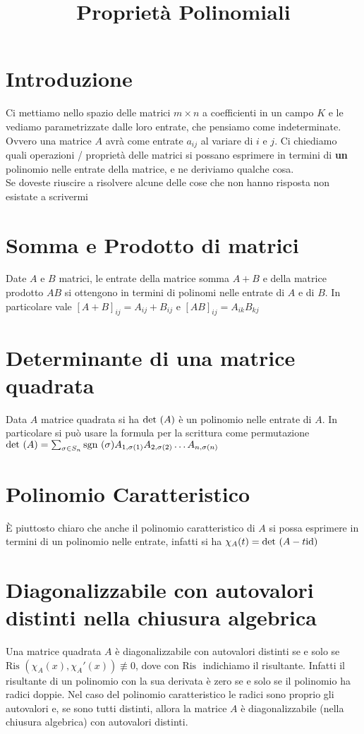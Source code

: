 \documentclass[a4paper,NoNotes,GeneralMath]{stdmdoc}
\theoremstyle{definition}
\newcommand{\sgn}{\text{sgn }}
\newcommand{\Ris}{\text{Ris }}
\begin{document}
	\title {Proprietà Polinomiali}
	\autodate
	
	\section {Introduzione}
	Ci mettiamo nello spazio delle matrici $m \times n$ a coefficienti in un campo $K$ e le vediamo parametrizzate dalle loro entrate, che pensiamo come indeterminate. Ovvero una matrice $A$ avrà come entrate $a_{ij}$ al variare di $i$ e $j$. Ci chiediamo quali operazioni / proprietà delle matrici si possano esprimere in termini di {\bf un} polinomio nelle entrate della matrice, e ne deriviamo qualche cosa. \\
	Se doveste riuscire a risolvere alcune delle cose che non hanno risposta non esistate a scrivermi
	
	\section {Somma e Prodotto di matrici}
	Date $A$ e $B$ matrici, le entrate della matrice somma $A + B$ e della matrice prodotto $AB$ si ottengono in termini di polinomi nelle entrate di $A$ e di $B$. In particolare vale $[A+B]_{ij} = A_{ij} + B_{ij}$ e $[AB]_{ij} = A_{ik}B_{kj}$
	
	\section {Determinante di una matrice quadrata}
	Data $A$ matrice quadrata si ha $\mbox{det }(A)$ è un polinomio nelle entrate di $A$. In particolare si può usare la formula per la scrittura come permutazione $\Det(A) = \sum_{\sigma \in S_n} \sgn(\sigma) A_{1,\sigma(1)} A_{2,\sigma(2)} \ldots A_{n,\sigma(n)}$
	
	\section {Polinomio Caratteristico}
	È piuttosto chiaro che anche il polinomio caratteristico di $A$ si possa esprimere in termini di un polinomio nelle entrate, infatti si ha $\chi_A(t) = \mbox{det }(A - t \mbox{id})$
	
	\section {Diagonalizzabile con autovalori distinti nella chiusura algebrica}
	Una matrice quadrata $A$ è diagonalizzabile con autovalori distinti se e solo se $\Ris(\chi_A(x), \chi_A'(x)) \not\equiv 0$, dove con $\Ris$ indichiamo il risultante. Infatti il risultante di un polinomio con la sua derivata è zero se e solo se il polinomio ha radici doppie. Nel caso del polinomio caratteristico le radici sono proprio gli autovalori e, se sono tutti distinti, allora la matrice $A$ è diagonalizzabile (nella chiusura algebrica) con autovalori distinti.
	
\end{document}
